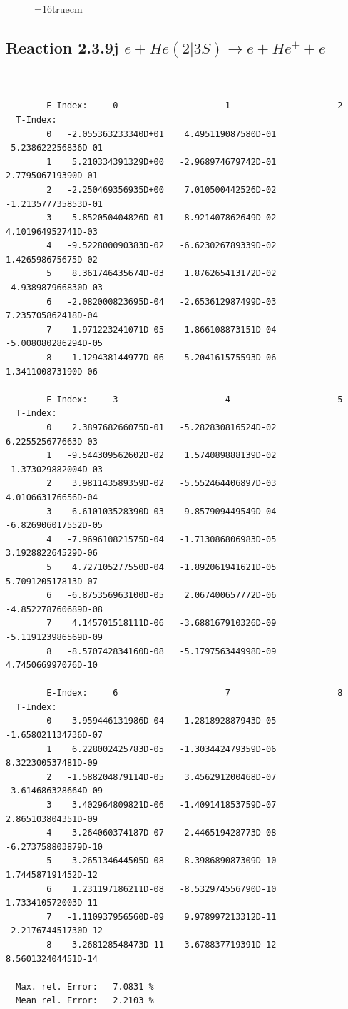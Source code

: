 \documentclass[12pt,dvips]{article}
\begin{document}
\begin{figure} \label{2.3.9i}
\epsfxsize=16truecm
\end{figure}
\newpage

\subsection{
Reaction 2.3.9j  $e + He(2|3S) \rightarrow e + He^+ + e $
}



\begin{small}\begin{verbatim}


        E-Index:     0                     1                     2
  T-Index:
        0   -2.055363233340D+01    4.495119087580D-01   -5.238622256836D-01
        1    5.210334391329D+00   -2.968974679742D-01    2.779506719390D-01
        2   -2.250469356935D+00    7.010500442526D-02   -1.213577735853D-01
        3    5.852050404826D-01    8.921407862649D-02    4.101964952741D-03
        4   -9.522800090383D-02   -6.623026789339D-02    1.426598675675D-02
        5    8.361746435674D-03    1.876265413172D-02   -4.938987966830D-03
        6   -2.082000823695D-04   -2.653612987499D-03    7.235705862418D-04
        7   -1.971223241071D-05    1.866108873151D-04   -5.008080286294D-05
        8    1.129438144977D-06   -5.204161575593D-06    1.341100873190D-06

        E-Index:     3                     4                     5
  T-Index:
        0    2.389768266075D-01   -5.282830816524D-02    6.225525677663D-03
        1   -9.544309562602D-02    1.574089888139D-02   -1.373029882004D-03
        2    3.981143589359D-02   -5.552464406897D-03    4.010663176656D-04
        3   -6.610103528390D-03    9.857909449549D-04   -6.826906017552D-05
        4   -7.969610821575D-04   -1.713086806983D-05    3.192882264529D-06
        5    4.727105277550D-04   -1.892061941621D-05    5.709120517813D-07
        6   -6.875356963100D-05    2.067400657772D-06   -4.852278760689D-08
        7    4.145701518111D-06   -3.688167910326D-09   -5.119123986569D-09
        8   -8.570742834160D-08   -5.179756344998D-09    4.745066997076D-10

        E-Index:     6                     7                     8
  T-Index:
        0   -3.959446131986D-04    1.281892887943D-05   -1.658021134736D-07
        1    6.228002425783D-05   -1.303442479359D-06    8.322300537481D-09
        2   -1.588204879114D-05    3.456291200468D-07   -3.614686328664D-09
        3    3.402964809821D-06   -1.409141853759D-07    2.865103804351D-09
        4   -3.264060374187D-07    2.446519428773D-08   -6.273758803879D-10
        5   -3.265134644505D-08    8.398689087309D-10    1.744587191452D-12
        6    1.231197186211D-08   -8.532974556790D-10    1.733410572003D-11
        7   -1.110937956560D-09    9.978997213312D-11   -2.217674451730D-12
        8    3.268128548473D-11   -3.678837719391D-12    8.560132404451D-14

  Max. rel. Error:   7.0831 %
  Mean rel. Error:   2.2103 %


\end{verbatim}\end{small}
\end{document}

